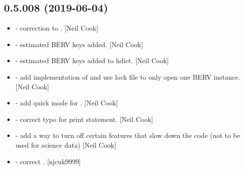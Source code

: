 \documentclass[a4paper,10pt,english]{report}
\begin{document}
\subsection{0.5.008 (2019-06-04)}
\label{\detokenize{misc/changelog:id128}}\begin{itemize}
\item {} 
 - correction to . {[}Neil Cook{]}

\item {} 
 - estimated BERV keys added. {[}Neil Cook{]}

\item {} 
 - estimated BERV keys added to hdict. {[}Neil
Cook{]}

\item {} 
 - add implementation of  and use lock file to
only open one BERV instance. {[}Neil Cook{]}

\item {} 
 - add quick mode for . {[}Neil Cook{]}

\item {} 
 - correct typo for print statement. {[}Neil Cook{]}

\item {} 
 - add a way to turn off certain features that
slow down the code (not to be used for science data) {[}Neil Cook{]}

\item {} 
 - correct . {[}njcuk9999{]}

\end{itemize}
\end{document}
